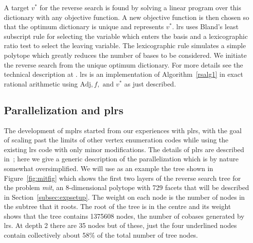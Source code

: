 \documentclass[a4paper,11pt]{article}   \usepackage{authblk} \usepackage[top=1.9cm,bottom=1.9cm,left=1.9cm,right=1.9cm]{geometry}
\newcommand{\progname}{\textsf}
\newcommand{\lrs}{\progname{lrs}\xspace}
\newcommand{\plrs}{\progname{plrs}\xspace}
\newcommand{\mplrs}{\progname{mplrs}\xspace}
\newcommand{\polytope}{\emph}
\newcommand{\mitine}{\polytope{mit}\xspace}
\newcommand{\Adj}{\textrm{Adj}}
\begin{document}
A target $v^*$ for the
reverse search is found by solving a linear program over this dictionary
with any objective function. A new objective
function is then chosen so that
the optimum dictionary is unique and represents $v^*$.
\lrs uses Bland's least subscript rule for selecting the variable which
enters the basis and a lexicographic ratio test to select the leaving variable.
The lexicographic rule simulates a simple polytope which greatly reduces the number
of bases to be considered. We initiate the reverse search from the unique optimum dictionary.
For more details see the technical description at \cite{lrs}.
\lrs is an implementation of Algorithm~\ref{rsalg1} in exact rational arithmetic
using $\Adj, f,\mbox{ and }v^*$ as just described.

\subsection{Parallelization and \plrs}
\label{sec:plrs}

The development of \mplrs started from our experiences with \plrs, with
the goal of scaling past the limits of other vertex enumeration codes
while using the existing \lrs code with only minor modifications.
The details of \plrs are described in~\cite{AR13};
here we give a generic description of the parallelization
which is by nature somewhat oversimplified. We will use as an example the tree shown
in Figure~\ref{fig:mitfig} which shows the first two layers of the
reverse search tree for the problem \mitine, an 8-dimensional polytope with
729 facets that will be described in Section~\ref{subsec:expsetup}. 
The weight on each node is
the number of nodes in the subtree 
that it roots. The root of the tree is in the centre and its weight
shows that the tree contains 1375608 nodes, the number of cobases generated
by \lrs. At depth 2 there are 35 nodes but of these, just the four 
underlined nodes
contain collectively about 58\% of the total number of tree nodes.
\end{document}
